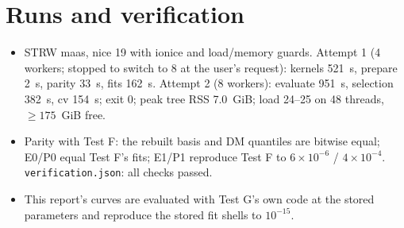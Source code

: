 \documentclass[10pt,a4paper]{article}
\begin{document}
\section{Runs and verification}
\begin{itemize}
\item STRW maas, nice 19 with ionice and load/memory guards. Attempt 1 (4 workers; stopped to switch to 8 at the user's
  request): kernels 521~s, prepare 2~s, parity 33~s, fits 162~s. Attempt 2 (8 workers): evaluate 951~s, selection 382~s,
  cv 154~s; exit 0; peak tree RSS 7.0~GiB; load 24--25 on 48 threads, $\ge175$~GiB free.
\item Parity with Test F: the rebuilt basis and DM quantiles are bitwise equal; E0/P0 equal Test F's fits; E1/P1 reproduce
  Test F to $6\times10^{-6}$ / $4\times10^{-4}$. \texttt{verification.json}: all checks passed.
\item This report's curves are evaluated with Test G's own code at the stored parameters and reproduce the stored fit
  shells to $10^{-15}$.
\end{itemize}

\appendix
\end{document}

